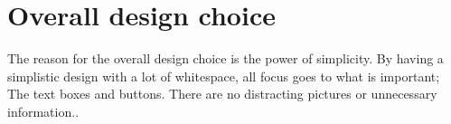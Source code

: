 \section{Overall design choice}
The reason for the overall design choice is the power of simplicity. By having a
simplistic design with a lot of whitespace, all focus goes to what is
important; The text boxes and buttons. There are no distracting
pictures or unnecessary information.\citep[p. 26 \& 32]{WebUI}.\\